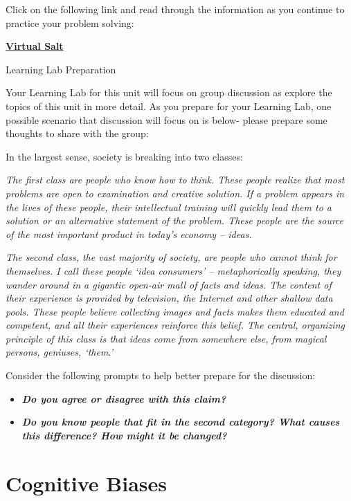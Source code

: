 \documentclass[
]{book}
\providecommand{\tightlist}{%
  \setlength{\itemsep}{0pt}\setlength{\parskip}{0pt}}
\begin{document}
\begin{reflect}
Click on the following link and read through the information as you continue to practice your problem solving:

\href{https://www.virtualsalt.com/crebook4.htm}{\textbf{Virtual Salt}}

{Learning Lab Preparation}

Your Learning Lab for this unit will focus on group discussion as explore the topics of this unit in more detail. As you prepare for your Learning Lab, one possible scenario that discussion will focus on is below- please prepare some thoughts to share with the group:

In the largest sense, society is breaking into two classes:

\emph{The first class are people who know how to think. These people realize that most problems are open to examination and creative solution. If a problem appears in the lives of these people, their intellectual training will quickly lead them to a solution or an alternative statement of the problem. These people are the source of the most important product in today's economy -- ideas.}

\emph{The second class, the vast majority of society, are people who cannot think for themselves. I call these people `idea consumers' -- metaphorically speaking, they wander around in a gigantic open-air mall of facts and ideas. The content of their experience is provided by television, the Internet and other shallow data pools. These people believe collecting images and facts makes them educated and competent, and all their experiences reinforce this belief. The central, organizing principle of this class is that ideas come from somewhere else, from magical persons, geniuses, `them.'}

Consider the following prompts to help better prepare for the discussion:

\begin{itemize}
\tightlist
\item
  \textbf{\emph{Do you agree or disagree with this claim?}}\\
\item
  \textbf{\emph{Do you know people that fit in the second category? What causes this difference? How might it be changed?}}
\end{itemize}
\end{reflect}

\hypertarget{cognitive-biases}{%
\section{Cognitive Biases}\label{cognitive-biases}}
\end{document}
